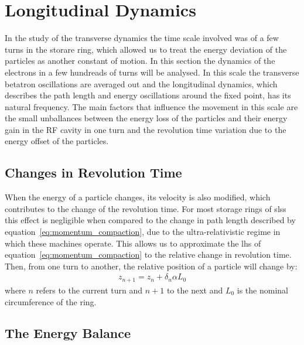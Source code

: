 \section{Longitudinal Dynamics}

    In the study of the transverse dynamics the time scale involved was of a few turns in the storare ring, which allowed us to treat the energy deviation of the particles as another constant of motion. In this section the dynamics of the electrons in a few hundreads of turns will be analysed. In this scale the transverse betatron oscillations are averaged out and the longitudinal dynamics, which describes the path length and energy oscillations around the fixed point, has its natural frequency. The main factors that influence the movement in this scale are the small unballances between the energy loss of the particles and their energy gain in the RF cavity in one turn and the revolution time variation due to the energy offset of the particles.

\subsection{Changes in Revolution Time}\label{sec:longitudinal_deviations}

    When the energy of a particle changes, its velocity is also modified, which contributes to the change of the revolution time. For most storage rings of \gls{sls}s this effect is negligible when compared to the change in path length described by equation~\eqref{eq:momentum_compaction}, due to the ultra-relativistic regime in which these machines operate. This allows us to approximate the \gls{lhs} of equation~\eqref{eq:momentum_compaction} to the relative change in revolution time. Then, from one turn to another, the relative position of a particle will change by:
	\begin{align}\label{eq:revolution_time_variation}
		z_{n+1} = z_n + \delta_n\alpha L_0
	\end{align}
	where $n$ refers to the current turn and $n+1$ to the next and $L_0$ is the nominal circumference of the ring.

\subsection{The Energy Balance}

